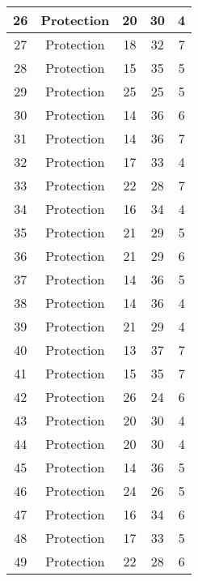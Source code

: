 \documentclass[results.tex]{subfiles}
\begin{document}
\begin{center}
\begin{tabular}{| c || c | c | c | c |}
    \hline
    26 & Protection & 20 & 30 & 4 \\ 
    \hline
    27 & Protection & 18 & 32 & 7 \\ 
    \hline
    28 & Protection & 15 & 35 & 5 \\ 
    \hline
    29 & Protection & 25 & 25 & 5 \\ 
    \hline
    30 & Protection & 14 & 36 & 6 \\ 
    \hline
    31 & Protection & 14 & 36 & 7 \\ 
    \hline
    32 & Protection & 17 & 33 & 4 \\ 
    \hline
    33 & Protection & 22 & 28 & 7 \\ 
    \hline
    34 & Protection & 16 & 34 & 4 \\ 
    \hline
    35 & Protection & 21 & 29 & 5 \\ 
    \hline
    36 & Protection & 21 & 29 & 6 \\ 
    \hline
    37 & Protection & 14 & 36 & 5 \\ 
    \hline
    38 & Protection & 14 & 36 & 4 \\ 
    \hline
    39 & Protection & 21 & 29 & 4 \\ 
    \hline
    40 & Protection & 13 & 37 & 7 \\ 
    \hline
    41 & Protection & 15 & 35 & 7 \\ 
    \hline
    42 & Protection & 26 & 24 & 6 \\ 
    \hline
    43 & Protection & 20 & 30 & 4 \\ 
    \hline
    44 & Protection & 20 & 30 & 4 \\ 
    \hline
    45 & Protection & 14 & 36 & 5 \\ 
    \hline
    46 & Protection & 24 & 26 & 5 \\ 
    \hline
    47 & Protection & 16 & 34 & 6 \\ 
    \hline
    48 & Protection & 17 & 33 & 5 \\ 
    \hline
    49 & Protection & 22 & 28 & 6 \\ 
    \hline   \end{tabular}
\end{center}
\end{document}
